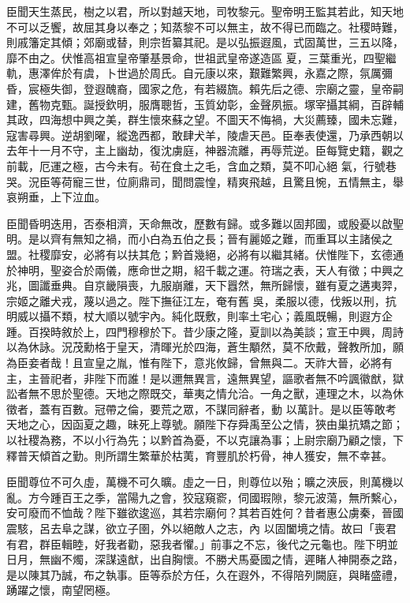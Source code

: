 \begin{pinyinscope}
 臣聞天生蒸民，樹之以君，所以對越天地，司牧黎元。聖帝明王監其若此，知天地不可以乏饗，故屈其身以奉之；知蒸黎不可以無主，故不得已而臨之。社稷時難，則戚籓定其傾；郊廟或替，則宗哲纂其祀。是以弘振遐風，式固萬世，三五以降，靡不由之。伏惟高祖宣皇帝肇基景命，世祖武皇帝遂造區
 夏，三葉重光，四聖繼軌，惠澤侔於有虞，卜世過於周氏。自元康以來，艱難繁興，永嘉之際，氛厲彌昏，宸極失御，登遐醜裔，國家之危，有若綴旒。賴先后之德、宗廟之靈，皇帝嗣建，舊物克甄。誕授欽明，服膺聰哲，玉質幼彰，金聲夙振。塚宰攝其綱，百辟輔其政，四海想中興之美，群生懷來蘇之望。不圖天不悔禍，大災薦臻，國未忘難，寇害尋興。逆胡劉曜，縱逸西都，敢肆犬羊，陵虐天邑。臣奉表使還，乃承西朝以去年十一月不守，主上幽劫，復沈虜庭，神器流離，再辱荒逆。臣每覽史籍，觀之前載，厄運之極，古今未有。茍在食土之毛，含血之類，莫不叩心絕
 氣，行號巷哭。況臣等荷寵三世，位廁鼎司，聞問震惶，精爽飛越，且驚且惋，五情無主，舉哀朔垂，上下泣血。



 臣聞昏明迭用，否泰相濟，天命無改，歷數有歸。或多難以固邦國，或殷憂以啟聖明。是以齊有無知之禍，而小白為五伯之長；晉有麗姬之難，而重耳以主諸侯之盟。社稷靡安，必將有以扶其危；黔首幾絕，必將有以繼其緒。伏惟陛下，玄德通於神明，聖姿合於兩儀，應命世之期，紹千載之運。符瑞之表，天人有徵；中興之兆，圖讖垂典。自京畿隕喪，九服崩離，天下囂然，無所歸懷，雖有夏之遘夷羿，宗姬之離犬戎，蔑以過之。陛下撫征江左，奄有舊
 吳，柔服以德，伐叛以刑，抗明威以攝不類，杖大順以號宇內。純化既敷，則率土宅心；義風既暢，則遐方企踵。百揆時敘於上，四門穆穆於下。昔少康之隆，夏訓以為美談；宣王中興，周詩以為休詠。況茂勳格于皇天，清暉光於四海，蒼生顒然，莫不欣戴，聲教所加，願為臣妾者哉！且宣皇之胤，惟有陛下，意兆攸歸，曾無與二。天祚大晉，必將有主，主晉祀者，非陛下而誰！是以邇無異言，遠無異望，謳歌者無不吟諷徽猷，獄訟者無不思於聖德。天地之際既交，華夷之情允洽。一角之獸，連理之木，以為休徵者，蓋有百數。冠帶之倫，要荒之眾，不謀同辭者，動
 以萬計。是以臣等敢考天地之心，因函夏之趣，昧死上尊號。願陛下存舜禹至公之情，狹由巢抗矯之節；以社稷為務，不以小行為先；以黔首為憂，不以克讓為事；上尉宗廟乃顧之懷，下釋普天傾首之勤。則所謂生繁華於枯荑，育豐肌於朽骨，神人獲安，無不幸甚。



 臣聞尊位不可久虛，萬機不可久曠。虛之一日，則尊位以殆；曠之浹辰，則萬機以亂。方今踵百王之季，當陽九之會，狡寇窺窬，伺國瑕隙，黎元波蕩，無所繫心，安可廢而不恤哉？陛下雖欲逡巡，其若宗廟何？其若百姓何？昔者惠公虜秦，晉國震駭，呂去阜之謀，欲立子圉，外以絕敵人之志，內
 以固闔境之情。故曰「喪君有君，群臣輯睦，好我者勸，惡我者懼。」前事之不忘，後代之元龜也。陛下明並日月，無幽不燭，深謀遠猷，出自胸懷。不勝犬馬憂國之情，遲睹人神開泰之路，是以陳其乃誠，布之執事。臣等忝於方任，久在遐外，不得陪列闕庭，與睹盛禮，踴躍之懷，南望罔極。




\end{pinyinscope}

